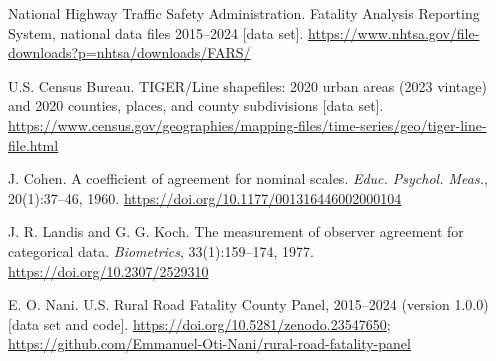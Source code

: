 \documentclass[12pt]{article}
\begin{document}
{\noindent [10] National Highway Traffic Safety Administration. Fatality Analysis Reporting System, national data files 2015--2024 [data set]. \url{https://www.nhtsa.gov/file-downloads?p=nhtsa/downloads/FARS/}

\noindent [11] U.S. Census Bureau. TIGER/Line shapefiles: 2020 urban areas (2023 vintage) and 2020 counties, places, and county subdivisions [data set]. \url{https://www.census.gov/geographies/mapping-files/time-series/geo/tiger-line-file.html}

\noindent [12] J. Cohen. A coefficient of agreement for nominal scales. \textit{Educ. Psychol. Meas.}, 20(1):37--46, 1960. \url{https://doi.org/10.1177/001316446002000104}

\noindent [13] J. R. Landis and G. G. Koch. The measurement of observer agreement for categorical data. \textit{Biometrics}, 33(1):159--174, 1977. \url{https://doi.org/10.2307/2529310}

\noindent [14] E. O. Nani. U.S. Rural Road Fatality County Panel, 2015--2024 (version 1.0.0) [data set and code]. \url{https://doi.org/10.5281/zenodo.23547650}; \url{https://github.com/Emmanuel-Oti-Nani/rural-road-fatality-panel}
}
\end{document}

